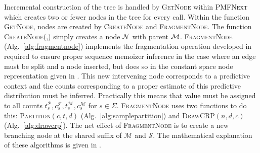 Incremental construction of the tree is handled by \textsc{GetNode} within \textsc{PMFNext} which creates two or fewer nodes in the tree for every call.  Within the function \textsc{GetNode}, nodes are created by \textsc{CreateNode} and \textsc{FragmentNode}. The function \textsc{CreateNode(\N,\M)} simply creates a node $\N$ with parent $\M$. \textsc{FragmentNode} (Alg.~\ref{alg:fragmentnode}) implements the fragmentation operation developed in \citep{Wood2009} required to ensure proper sequence memoizer inference in the case where an edge must be split and a node inserted, but does so in the constant space node representation given in \citep{Gasthaus2011}.  This new intervening node corresponds to a predictive context and the counts corresponding to a proper estimate of this predictive distribution must be inferred.   Practically this means that value must be assigned to all counts $t_s^\mathcal{P}, c_s^\mathcal{P}, t_s^\mathcal{M}, c_s^\mathcal{M}$ for $s\in\Sigma$.  \textsc{FragmentNode} uses two functions to do this: \textsc{Partition}$(c,t,d)$ (Alg.~\ref{alg:samplepartition}) and \textsc{DrawCRP}$(n,d,c)$ (Alg.~\ref{alg:drawcrp}).  The net effect of \textsc{FragmentNode} is to create a new branching node at the shared suffix of $\mathcal{M}$ and $\mathcal{S}.$   The mathematical explanation of these algorithms is given in \citep{Gasthaus2011}.  %

